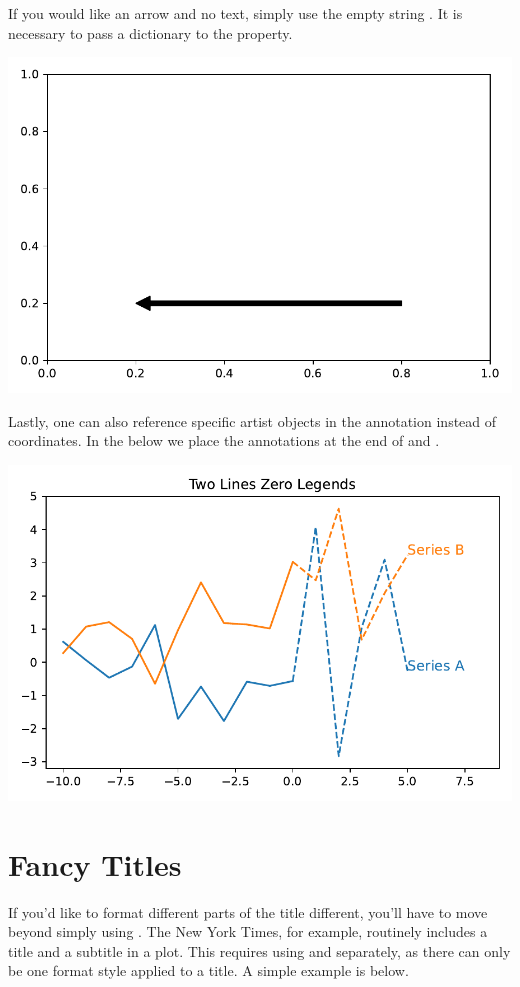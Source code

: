 If you would like an arrow and no text, simply use the empty string . It is necessary to pass a dictionary to the  property. 


\begin{center}
    \includegraphics[width = .7\textwidth]{figures/proseplots/arrow-only.pdf}
\end{center}


Lastly, one can also reference specific artist objects in the annotation instead of coordinates. In the below we place the annotations at the end of  and .  


\begin{center}
    \includegraphics[width = .7\textwidth]{figures/proseplots/direct-annotation.pdf}
\end{center}



\section{Fancy Titles}
If you'd like to format different parts of the title different, you'll have to move beyond simply using . The New York Times, for example, routinely includes a title and a subtitle in a plot. This requires using  and  separately, as there can only be one format style applied to a title. A simple example is below.

